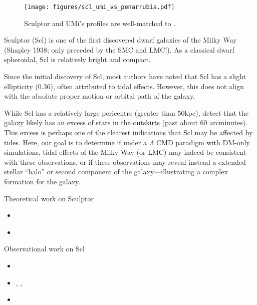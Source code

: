 \begin{figure}
\centering
\texttt{[image: figures/scl\_umi\_vs\_penarrubia.pdf]}
\caption[Idealized simulations match Scl and UMi]{Sculptor and UMi's
profiles are well-matched to \citet{PNM2008}.}\label{fig:toy_profiles}
\end{figure}

Sculptor (Scl) is one of the first discovered dwarf galaxies of the
Milky Way (Shapley 1938; only preceded by the SMC and LMC!). As a
classical dwarf spheroidal, Scl is relatively bright and compact.

Since the initial discovery of Scl, most authors have noted that Scl has
a slight ellipticity (\(0.36\)), often attributed to tidal effects.
However, this does not align with the absolute proper motion or orbital
path of the galaxy.

While Scl has a relatively large pericentre (greater than 50kpc),
\citet{sestito+2023a} detect that the galaxy likely has an excess of
stars in the outskirts (past about 60 arcminutes). This excess is
perhaps one of the clearest indications that Scl may be affected by
tides. Here, our goal is to determine if under a \(\Lambda\) CMD
paradigm with DM-only simulations, tidal effects of the Milky Way (or
LMC) may indeed be consistent with these observations, or if these
observations may reveal instead a extended stellar ``halo'' or second
component of the galaxy---illustrating a complex formation for the
galaxy.

Theoretical work on Sculptor

\begin{itemize}
\tightlist
\item
  \citet{battaglia+2008}
\item
  \citet{iorio+2019}
\end{itemize}

Observational work on Scl

\begin{itemize}
\tightlist
\item
  \citet{sestito+2023a}
\item
  \citet{tolstoy+2023}, \citet{arroyo-polonio+2023},
  \citet{arroyo-polonio+2024}
\item
  \citet{eskridge1988}
\end{itemize}

